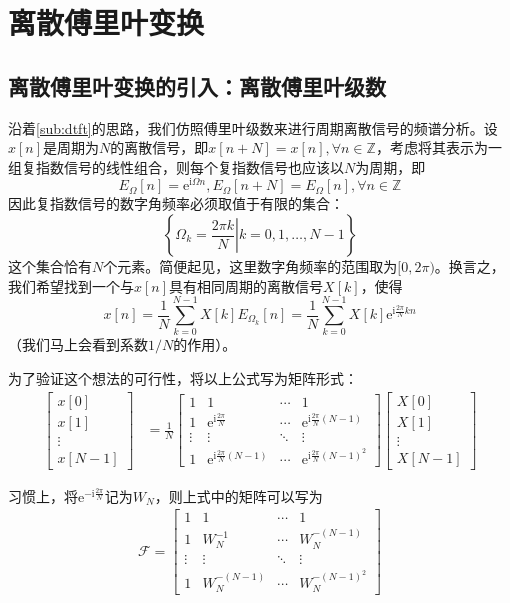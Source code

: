 \section{离散傅里叶变换}\label{sec:DFT}

\subsection{离散傅里叶变换的引入：离散傅里叶级数}\label{sub:intro_DFT}

沿着\ref{sub:dtft}的思路，我们仿照傅里叶级数来进行周期离散信号的频谱分析。设$x[n]$是周期为$N$的离散信号，即$x[n+N]=x[n],\forall n\in\mathbb{Z}$，考虑将其表示为一组复指数信号的线性组合，则每个复指数信号也应该以$N$为周期，即
\[E_{\Omega}[n]=\mathrm{e}^{\mathrm{i}\Omega n},E_{\Omega}[n+N]=E_{\Omega}[n],\forall n\in\mathbb{Z}\]
因此复指数信号的数字角频率必须取值于有限的集合：
\[\left\{\left.\Omega_k=\frac{2\pi k}{N}\right|k=0,1,\dots,N-1\right\}\]
这个集合恰有$N$个元素。简便起见，这里数字角频率的范围取为$[0,2\pi)$。换言之，我们希望找到一个与$x[n]$具有相同周期的离散信号$X[k]$，使得
\[x[n]=\frac{1}{N}\sum_{k=0}^{N-1}X[k]E_{\Omega_k}[n]=\frac{1}{N}\sum_{k=0}^{N-1}X[k]\mathrm{e}^{\mathrm{i}\frac{2\pi}{N}kn}\]
（我们马上会看到系数$1/N$的作用）。

为了验证这个想法的可行性，将以上公式写为矩阵形式：
\begin{align*}
\begin{bmatrix}x[0]  \\
x[1]  \\
\vdots \\
x[N-1]
\end{bmatrix}&=\frac{1}{N}\begin{bmatrix}1 & 1 & \cdots & 1 \\
1 & \mathrm{e}^{\mathrm{i}\frac{2\pi}{N}} & \cdots & \mathrm{e}^{\mathrm{i}\frac{2\pi}{N}(N-1)} \\
\vdots & \vdots & \ddots & \vdots \\
1 & \mathrm{e}^{\mathrm{i}\frac{2\pi}{N}(N-1)} & \cdots & \mathrm{e}^{\mathrm{i}\frac{2\pi}{N}(N-1)^2}
\end{bmatrix}\begin{bmatrix}X[0]  \\
X[1]  \\
\vdots \\
X[N-1]
\end{bmatrix}
\end{align*}

习惯上，将$\mathrm{e}^{-\mathrm{i}\frac{2\pi}{N}}$记为$W_N$，则上式中的矩阵可以写为
\begin{align*}
    \mathcal{F} =\begin{bmatrix}1 & 1 & \cdots & 1 \\
        1 & W_N^{-1} & \cdots & W_N^{-(N-1)} \\
        \vdots & \vdots & \ddots & \vdots \\
        1 & W_N^{-(N-1)} & \cdots & W_N^{-(N-1)^2}
    \end{bmatrix}
\end{align*}

